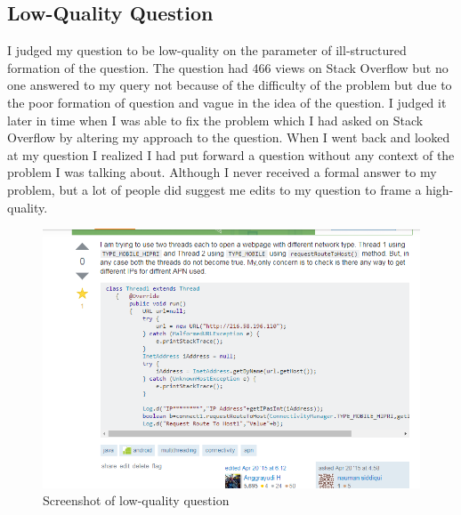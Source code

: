 \documentclass[12pt]{report}
\begin{document}
\subsection{Low-Quality Question}
I judged my question to be low-quality on the parameter of ill-structured formation of the question. The question had 466 views on Stack Overflow but no one answered to my query not because of the difficulty of the problem but due to the poor formation of question and vague in the idea of the question. I judged it later in time when I was able to fix the problem which I had asked on Stack Overflow by altering my approach to the question. When I went back and looked at my question I realized I had put forward a question without any context of the problem I was talking about. Although I never received a formal answer to my problem, but a lot of people did suggest me edits to my question to frame a high-quality. 

\begin{figure}[ht]
  \centering
  \includegraphics[width=1\textwidth]{Problem10_5/LowQuality.png}
  \caption{Screenshot of low-quality question}
  \label{fig:1}
\end{figure} 
\end{document}
